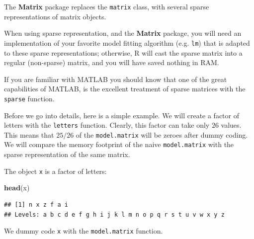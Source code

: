 \documentclass[]{book}
\newenvironment{Shaded}{\begin{snugshade}}{\end{snugshade}}
\newcommand{\KeywordTok}[1]{\textcolor[rgb]{0.13,0.29,0.53}{\textbf{{#1}}}}
\newcommand{\DataTypeTok}[1]{\textcolor[rgb]{0.13,0.29,0.53}{{#1}}}
\newcommand{\FloatTok}[1]{\textcolor[rgb]{0.00,0.00,0.81}{{#1}}}
\newcommand{\StringTok}[1]{\textcolor[rgb]{0.31,0.60,0.02}{{#1}}}
\newcommand{\CommentTok}[1]{\textcolor[rgb]{0.56,0.35,0.01}{\textit{{#1}}}}
\newcommand{\OtherTok}[1]{\textcolor[rgb]{0.56,0.35,0.01}{{#1}}}
\newcommand{\NormalTok}[1]{{#1}}
\theoremstyle{definition}
\theoremstyle{definition}
\theoremstyle{remark}
\let\BeginKnitrBlock\begin \let\EndKnitrBlock\end
\begin{document}
The \textbf{Matrix} package replaces the \texttt{matrix} class, with
several sparse representations of matrix objects.

When using sparse representation, and the \textbf{Matrix} package, you
will need an implementation of your favorite model fitting algorithm
(e.g. \texttt{lm}) that is adapted to these sparse representations;
otherwise, R will cast the sparse matrix into a regular (non-sparse)
matrix, and you will have saved nothing in RAM.

\BeginKnitrBlock{remark}
If you are familiar with MATLAB you should know
that one of the great capabilities of MATLAB, is the excellent treatment
of sparse matrices with the \texttt{sparse} function.
\EndKnitrBlock{remark}

Before we go into details, here is a simple example. We will create a
factor of letters with the \texttt{letters} function. Clearly, this
factor can take only \(26\) values. This means that \(25/26\) of the
\texttt{model.matrix} will be zeroes after dummy coding. We will compare
the memory footprint of the naive \texttt{model.matrix} with the sparse
representation of the same matrix.

\begin{Shaded}
\end{Shaded}

The object \texttt{x} is a factor of letters:

\begin{Shaded}
\begin{Highlighting}[]
\KeywordTok{head}\NormalTok{(x)}
\end{Highlighting}
\end{Shaded}

\begin{verbatim}
## [1] n x z f a i
## Levels: a b c d e f g h i j k l m n o p q r s t u v w x y z
\end{verbatim}

We dummy code \texttt{x} with the \texttt{model.matrix} function.
\end{document}
